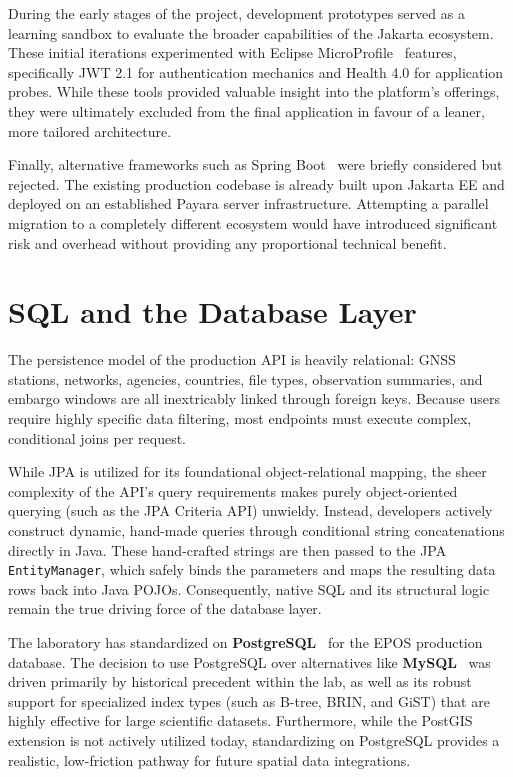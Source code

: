 During the early stages of the project, development prototypes served as a
learning sandbox to evaluate the broader capabilities of the Jakarta
ecosystem. These initial iterations experimented with Eclipse MicroProfile~\cite{microprofile}
features, specifically \ac{JWT} 2.1 for authentication mechanics and Health 4.0
for application probes. While these tools provided valuable insight into
the platform's offerings, they were ultimately excluded from the final application
in favour of a leaner, more tailored architecture.

Finally, alternative frameworks such as Spring Boot~\cite{springBoot} were briefly
considered but rejected. The existing production codebase is already built
upon Jakarta EE and deployed on an established Payara server infrastructure.
Attempting a parallel migration to a completely different ecosystem would have
introduced significant risk and overhead without providing any proportional technical
benefit.

\section{SQL and the Database Layer}
\label{sec:sql}

The persistence model of the production \ac{API} is heavily relational: \ac{GNSS}
stations, networks, agencies, countries, file types, observation summaries, and
embargo windows are all inextricably linked through foreign keys. Because
users require highly specific data filtering, most endpoints must execute complex,
conditional joins per request.

While \ac{JPA} is utilized for its foundational object-relational mapping,
the sheer complexity of the API's query requirements makes purely object-oriented
querying (such as the \ac{JPA} Criteria API) unwieldy. Instead, developers actively
construct dynamic, hand-made queries through conditional string
concatenations directly in Java. These hand-crafted strings are then passed to
the \ac{JPA} \texttt{EntityManager}, which safely binds the parameters and
maps the resulting data rows back into Java \acp{POJO}. Consequently, native
\ac{SQL} and its structural logic remain the true driving force of the
database layer.

The laboratory has standardized on \textbf{PostgreSQL}~\cite{postgresql} for
the \ac{EPOS} production database. The decision to use PostgreSQL over alternatives
like \textbf{MySQL}~\cite{mysql} was driven primarily by historical
precedent within the lab, as well as its robust support for specialized index
types (such as B-tree, BRIN, and GiST) that are highly effective for large scientific
datasets. Furthermore, while the PostGIS extension is not actively utilized today,
standardizing on PostgreSQL provides a realistic, low-friction pathway for future
spatial data integrations.

